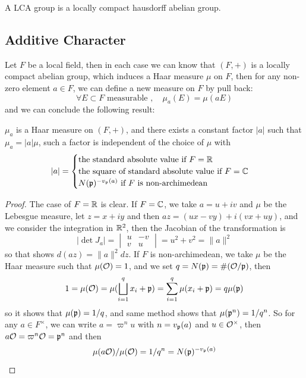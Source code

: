 \begin{definition}
    A LCA group is a locally compact hausdorff abelian group.
\end{definition}

\subsection{Additive Character}

Let \(F\) be a local field, then in each case we can know that \((F,+)\) is a locally compact abelian group, which induces a Haar measure \(\mu\) on \(F\), then for any non-zero element \(a \in F\), we can define a new measure on \(F\) by pull back:
\[\forall E \subset F \text{ measurable }, \quad  \mu_a(E) = \mu(aE)  \]
and we can conclude the following result:

\begin{lemma} \label{normalizedmodule}
    \(\mu_a\) is a Haar measure on \((F,+)\), and there exists a constant factor \(|a|\) such that \(\mu_a = |a| \mu\), such a factor is independent of the choice of \(\mu\) with
    \[|a| = \begin{cases}
        \text{the standard absolute value if } F = \mathbb{R} \\
        \text{the square of standard absolute value if } F = \mathbb{C} \\
        N(\mathfrak{p})^{-v_{\mathfrak{p}}(a)} \text{ if } F \text{ is non-archimedean}
    \end{cases}\]
\end{lemma}

\begin{proof}
    The case of \(F =\mathbb{R}\) is clear. If \(F = \mathbb{C}\), we take \(a = u + iv\) and \(\mu\) be the Lebesgue measure, let \(z = x+iy\) and then \(az = (ux - vy) + i(vx+uy)\), and we consider the integration in \(\mathbb{R}^2\), then the Jacobian of the transformation is 
    \[|\det J_a| = \begin{vmatrix}
        u & -v \\
        v & u
    \end{vmatrix} = u^2 + v^2 = \|a\|^2 \]
    so that shows \(d(az) = \|a\|^2 dz\). If \(F\) is non-archimedean, we take \(\mu\) be the Haar measure such that \(\mu(\mathcal{O}) = 1\), and we set \(q = N(\mathfrak{p}) = \#(\mathcal{O}/\mathfrak{p})\), then
    \[1 = \mu(\mathcal{O}) = \mu(\bigsqcup_{i=1}^q x_i + \mathfrak{p}) = \sum_{i=1}^q \mu(x_i + \mathfrak{p}) = q \mu(\mathfrak{p}) \]
    so it shows that \(\mu(\mathfrak{p}) = 1/q\), and same method shows that \(\mu(\mathfrak{p}^n) = 1/q^n\). So for any \(a \in F^\times\), we can write \(a = \varpi^nu\) with \(n = v_{\mathfrak{p}}(a)\) and \(u \in \mathcal{O}^\times\), then \(a\mathcal{O} = \varpi^n\mathcal{O} = \mathfrak{p}^n\) and then 
    \[\mu(a\mathcal{O})/\mu(\mathcal{O}) = 1/q^n = N(\mathfrak{p})^{-{v_{\mathfrak{p}}(a)}}\]
\end{proof}

